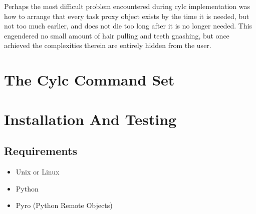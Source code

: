 \documentclass[11pt,a4paper]{article}
\begin{document}

Perhaps the most difficult problem encountered during cylc
implementation was how to arrange that every task proxy object exists by
the time it is needed, but not too much earlier, and does not die too
long after it is no longer needed. This engendered no small amount
of hair pulling and teeth gnashing, but once achieved the complexities
therein are entirely hidden from the user.




\pagebreak

\section{The Cylc Command Set}
\lstset{language=usage}

\pagebreak

\section{Installation And Testing} 
\label{InstallationAndTesting}

\subsection{Requirements} 
\label{Requirements}

\begin{itemize}
    \item Unix or Linux
    \item Python
    \item Pyro (Python Remote Objects)
\end{itemize}
\end{document}
